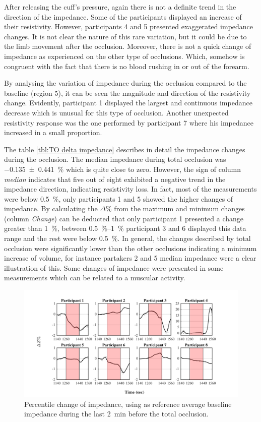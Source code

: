 After releasing the cuff's pressure, again there is not a definite trend in the direction of the impedance. Some of the participants displayed an increase of their resistivity. However, participants 4 and 5 presented exaggerated impedance changes. It is not clear the nature of this rare variation, but it could be due to the limb movement after the occlusion. Moreover, there is not a quick change of impedance as experienced on the other type of occlusions. Which, somehow is congruent with the fact that there is no blood rushing in or out of the forearm.

By analysing the variation of impedance during the occlusion compared to the baseline (region 5), it can be seen the magnitude and direction of the resistivity change. Evidently, participant 1 displayed the largest and continuous impedance decrease which is unusual for this type of occlusion. Another unexpected resistivity response was the one performed by participant 7 where his impedance increased in a small proportion.  

The table \ref{tbl:TO delta impedance} describes in detail the impedance changes during the occlusion. The median impedance during total occlusion was \SI{-0.135(0441)}{\percent} which is quite close to zero. However, the sign of column \textit{median} indicates that five out of eight exhibited a negative trend in the impedance direction, indicating resistivity loss. In fact, most of the measurements were below \SI{0.5}{\percent}, only participants 1 and 5 showed the higher changes of impedance. By calculating the $\Delta \%$  from the maximum and minimum changes (column \textit{Change}) can be deducted that only participant 1 presented a change greater than \SI{1}{\percent}, between \SIrange{0.5}{1}{\percent} participant 3 and 6 displayed this data range and the rest were below \SI{0.5}{\percent}. In general, the changes described by total occlusion were significantly lower than the other occlusions indicating a minimum increase of volume, for instance partakers 2 and 5 median impedance were a clear illustration of this. Some changes of impedance were presented in some measurements which can be related to a muscular activity. 

\begin{figure}[htbp]
	\centering
	\includegraphics[width=15cm,keepaspectratio]{figure_vop_8}    
	\caption [Percentile variation of impedance during total occlusion]{Percentile change of impedance, using as reference average baseline impedance during the last \SI{2}{\minute} before the total occlusion.}
	\label{fig:total occlusion imepdance}
\end{figure} 

